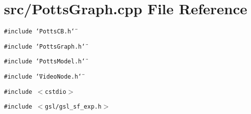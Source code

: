 \section{src/PottsGraph.cpp File Reference}
\label{PottsGraph_8cpp}
{\tt \#include \char`\"{}PottsCB.h\char`\"{}}\par
{\tt \#include \char`\"{}PottsGraph.h\char`\"{}}\par
{\tt \#include \char`\"{}PottsModel.h\char`\"{}}\par
{\tt \#include \char`\"{}VideoNode.h\char`\"{}}\par
{\tt \#include $<$cstdio$>$}\par
{\tt \#include $<$gsl/gsl\_\-sf\_\-exp.h$>$}\par
